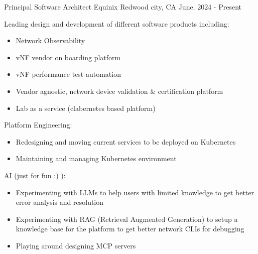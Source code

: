 

\begin{cventries}


  \cventry
    {Principal Software Architect} %
    {Equinix} %
    {Redwood city, CA} %
    {June. 2024 - Present} %
    {
      \begin{cvitems} %
        \item {Leading design and development of  different software products including:
          \begin{itemize}
            \item {Network Observability}
            \item {vNF vendor on boarding platform}
            \item {vNF performance test automation}
            \item {Vendor agnostic, network device validation \& certification platform}
            \item {Lab as a service (clabernetes based platform)}
          \end{itemize}
        }
        \item {Platform Engineering:
          \begin{itemize}
            \item {Redesigning and moving current services to be deployed on Kubernetes}
            \item {Maintaining and managing Kubernetes environment}
          \end{itemize}
        }
        \item {AI (just for fun :) ):
          \begin{itemize}
            \item {Experimenting with LLMs to help users with limited knowledge to get better error analysis and resolution}
            \item {Experimenting with RAG (Retrieval Augmented Generation) to setup a knowledge base for the platform to get better network CLIs for debugging}
            \item {Playing around designing MCP servers}

\end{itemize}}
\end{cvitems}}
\end{cventries}
